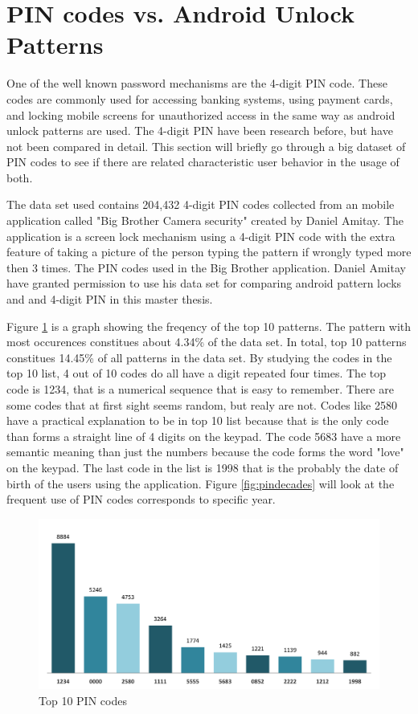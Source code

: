 \section{PIN codes vs. Android Unlock Patterns}

  One of the well known password mechanisms are the 4-digit PIN code. These codes are commonly used for accessing banking systems, using payment cards, and locking mobile screens for unauthorized access in the same way as android unlock patterns are used. The 4-digit PIN have been research before, but have not been compared in detail. This section will briefly go through a big dataset of PIN codes to see if there are related characteristic user behavior in the usage of both. 

  The data set used contains 204,432 4-digit PIN codes \cite{danielamitay} collected from an mobile application called "Big Brother Camera security" \cite{bigbrother} created by Daniel Amitay. The application is a screen lock mechanism using a 4-digit PIN code with the extra feature of taking a picture of the person typing the pattern if wrongly typed more then 3 times. The PIN codes used in the Big Brother application. Daniel Amitay have granted permission to use his data set for comparing android pattern locks and and 4-digit PIN in this master thesis. 

  Figure \ref{fig:top10pins} is a graph showing the freqency of the top 10 patterns. The pattern with most occurences constitues about 4.34\% of the data set.
  In total, top 10 patterns constitues 14.45\% of all patterns in the data set. By studying the codes in the top 10 list, 4 out of 10 codes do all have a digit repeated four times. The top code is 1234, that is a numerical sequence that is easy to remember. There are some codes that at first sight seems random, but realy are not. Codes like 2580 have a practical explanation to be in top 10 list because that is the only code than forms a straight line of 4 digits on the keypad. The code 5683 have a more semantic meaning than just the numbers because the code forms the word "love" on the keypad. The last code in the list is 1998 that is the probably the date of birth of the users using the application. Figure \ref{fig:pindecades} will look at the frequent use of PIN codes corresponds to specific year.

  \begin{figure}[H]
    \centering
    \includegraphics[width=\textwidth]{pics/analysis/top10pin.png}
    \caption{Top 10 PIN codes}
    \label{fig:top10pins}
  \end{figure}

